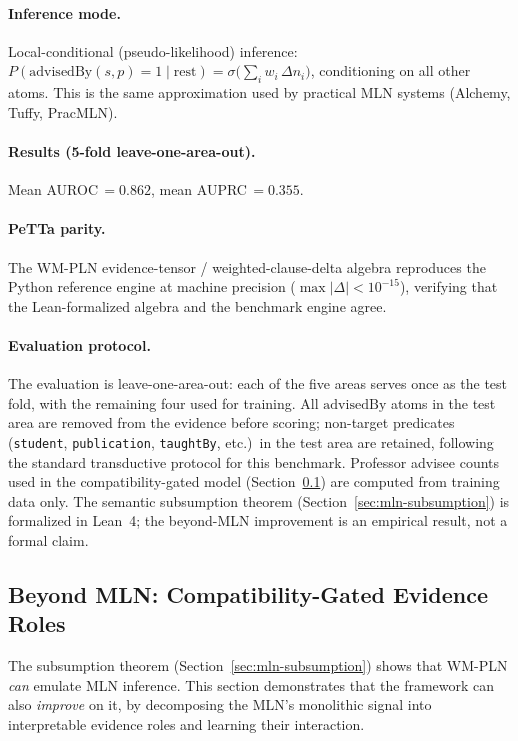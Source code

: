 \documentclass[11pt,openany]{report}
\begin{document}
\paragraph{Inference mode.}
Local-conditional (pseudo-likelihood) inference:
$P(\mathrm{advisedBy}(s,p) = 1 \mid \text{rest})
  = \sigma\!\bigl(\sum_i w_i \,\Delta n_i\bigr)$,
conditioning on all other atoms.  This is the same approximation used
by practical MLN systems (Alchemy, Tuffy, PracMLN).

\paragraph{Results (5-fold leave-one-area-out).}
Mean AUROC\,$= 0.862$, mean AUPRC\,$= 0.355$.

\paragraph{PeTTa parity.}
The WM-PLN evidence-tensor / weighted-clause-delta algebra reproduces the
Python reference engine at machine precision ($\max |\Delta| < 10^{-15}$),
verifying that the Lean-formalized algebra and the benchmark engine agree.

\paragraph{Evaluation protocol.}
The evaluation is leave-one-area-out: each of the five areas serves once
as the test fold, with the remaining four used for training.  All
$\mathrm{advisedBy}$ atoms in the test area are removed from the
evidence before scoring; non-target predicates (\texttt{student},
\texttt{publication}, \texttt{taughtBy}, etc.)\ in the test area are
retained, following the standard transductive protocol for this
benchmark.  Professor advisee counts used in the compatibility-gated
model (Section~\ref{sec:beyond-mln}) are computed from training data
only.  The semantic subsumption theorem
(Section~\ref{sec:mln-subsumption}) is formalized in Lean~4; the
beyond-MLN improvement is an empirical result, not a formal claim.

\subsection{Beyond MLN: Compatibility-Gated Evidence Roles}
\label{sec:beyond-mln}

The subsumption theorem (Section~\ref{sec:mln-subsumption}) shows that
WM-PLN \emph{can} emulate MLN inference.  This section demonstrates that
the framework can also \emph{improve} on it, by decomposing the MLN's
monolithic signal into interpretable evidence roles and learning their
interaction.
\end{document}
